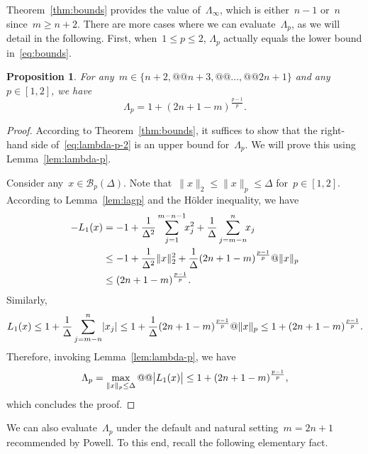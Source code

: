 \documentclass{article}
\theoremstyle{definition}
\theoremstyle{plain}
\newtheorem{proposition}{Proposition}[section]
\theoremstyle{remark}
\newcommand*{\abs}[2][]{#1\lvert#2#1\rvert}
\newcommand*{\norm}[2][]{#1\lVert#2#1\rVert}
\newcommand*{\set}[2][]{#1\{#2#1\}}
\newcommand*{\lagp}[1][]{L\ifblank{#1}{}{_{#1}}}
\begin{document}
Theorem~\ref{thm:bounds} provides the value of~$\Lambda_{\infty}$, which is either~$n - 1$ or~$n$ since~$m \ge n + 2$.
There are more cases where we can evaluate~$\Lambda_p$, as we will detail in the following.
First, when~$1 \le p \le 2$, $\Lambda_p$ actually equals the lower bound in~\eqref{eq:bounds}.

\begin{proposition}
    \label{prop:lambda-p-2}
    For any~$m \in \set{n + 2, @@ n + 3, @@ \dots, @@ 2n + 1}$ and any~$p \in[1, 2]$, we have
    \begin{equation}
        \label{eq:lambda-p-2}
        \Lambda_p = 1 + (2n + 1 - m)^{\frac{p - 1}{p}}.
    \end{equation}
\end{proposition}

\begin{proof}
    According to Theorem~\ref{thm:bounds}, it suffices to show that the right-hand side of~\eqref{eq:lambda-p-2} is an upper bound for~$\Lambda_p$.
    We will prove this using Lemma~\ref{lem:lambda-p}.

    Consider any~$x \in \mathcal{B}_p(\Delta)$.
    Note that~$\norm{x}_2 \le\norm{x}_p \le \Delta $ for~$p\in[1, 2]$.
    According to Lemma~\ref{lem:lagp} and the H{\"{o}}lder inequality, we have
    \begin{align*}
        -\lagp[1](x)    &= -1 + \frac{1}{\Delta^2} \sum_{j = 1}^{m - n - 1} \!\! x_j^2 + \frac{1}{\Delta} \sum_{j = m - n}^n \!\! x_j\\
                        &\le -1 + \frac{1}{\Delta^2}\norm{x}_2^2 + \frac{1}{\Delta} (2n+1-m)^{\frac{p-1}{p}} @ \norm{x}_p\\
                        &\le (2n+1-m)^{\frac{p-1}{p}}.
    \end{align*}
    Similarly,
    \begin{equation*}
        \lagp[1](x) \le 1 + \frac{1}{\Delta}\sum_{j = m - n}^n \abs{x_j} \le 1 + \frac{1}{\Delta} (2n + 1 - m)^{\frac{p-1}{p}} @ \norm{x}_p \le 1 + (2n + 1 - m)^{\frac{p - 1}{p}}.
    \end{equation*}
    Therefore, invoking Lemma~\ref{lem:lambda-p}, we have
    \begin{equation*}
        \Lambda_p = \max_{\norm{x}_p \le \Delta} @@ \abs[\big]{\lagp[1](x)} \le 1 + (2n + 1 - m)^{\frac{p - 1}{p}},
    \end{equation*}
    which concludes the proof.
\end{proof}

We can also evaluate~$\Lambda_p$ under the default and natural setting~$m = 2n + 1$ recommended by Powell.
To this end, recall the following elementary fact.
\end{document}
